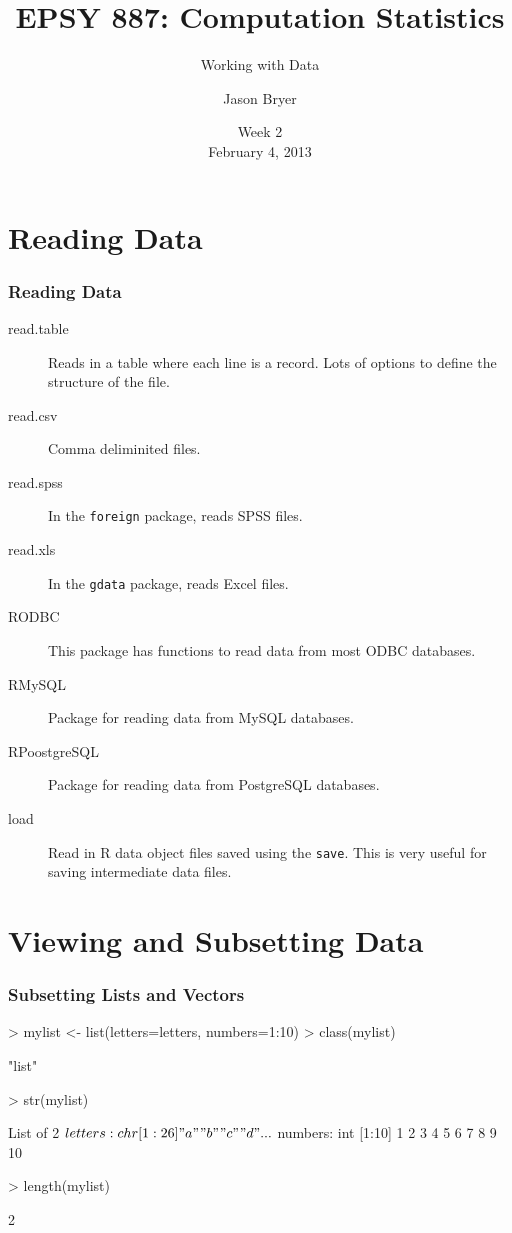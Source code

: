 \documentclass[10pt,slidestop,mathserif,c]{beamer}
\title{EPSY 887: Computation Statistics}
\subtitle{Working with Data}
\author[Jason Bryer]{Jason Bryer}
\institute[Jason.Bryer.org]{\url{http://github.com/jbryer/CompStats}\\\href{mailto:jason@bryer.org}{jason@bryer.org}}
\date[Feb 4, 2013]{Week 2\\February 4, 2013}
\begin{document}


\frame{\titlepage}

\section{Reading Data}

\begin{frame}[fragile]
	\frametitle{Reading Data}
	\begin{description}
		\item[read.table] Reads in a table where each line is a record. Lots of options to define the structure of the file.
		\item[read.csv] Comma deliminited files.
		\item[read.spss] In the \texttt{foreign} package, reads SPSS files.
		\item[read.xls] In the \texttt{gdata} package, reads Excel files.
		\item[RODBC] This package has functions to read data from most ODBC databases.
		\item[RMySQL] Package for reading data from MySQL databases.
		\item[RPoostgreSQL] Package for reading data from PostgreSQL databases.
		\item[load] Read in R data object files saved using the \texttt{save}. This is very useful for saving intermediate data files.
	\end{description}
\end{frame}

\section{Viewing and Subsetting Data}

\begin{frame}
	\frametitle{Subsetting Lists and Vectors}
\begin{Schunk}
\begin{Sinput}
> mylist <- list(letters=letters, numbers=1:10)
> class(mylist)
\end{Sinput}
\begin{Soutput}
[1] "list"
\end{Soutput}
\begin{Sinput}
> str(mylist)
\end{Sinput}
\begin{Soutput}
List of 2
 $ letters: chr [1:26] "a" "b" "c" "d" ...
 $ numbers: int [1:10] 1 2 3 4 5 6 7 8 9 10
\end{Soutput}
\begin{Sinput}
> length(mylist)
\end{Sinput}
\begin{Soutput}
[1] 2
\end{Soutput}
\end{Schunk}
\end{frame}
\end{document}
